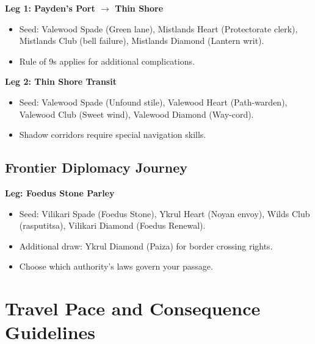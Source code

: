 \textbf{Leg 1: Payden's Port $\rightarrow$ Thin Shore}
\begin{itemize}
    \item Seed: Valewood Spade (Green lane), Mistlands Heart (Protectorate clerk), Mistlands Club (bell failure), Mistlands Diamond (Lantern writ).
    \item Rule of 9s applies for additional complications.
\end{itemize}

\textbf{Leg 2: Thin Shore Transit}
\begin{itemize}
    \item Seed: Valewood Spade (Unfound stile), Valewood Heart (Path‑warden), Valewood Club (Sweet wind), Valewood Diamond (Way‑cord).
    \item Shadow corridors require special navigation skills.
\end{itemize}

\subsection{Frontier Diplomacy Journey}\label{subsec:frontier_diplomacy}

\textbf{Leg: Foedus Stone Parley}
\begin{itemize}
    \item Seed: Vilikari Spade (Foedus Stone), Ykrul Heart (Noyan envoy), Wilds Club (rasputitsa), Vilikari Diamond (Foedus Renewal).
    \item Additional draw: Ykrul Diamond (Paiza) for border crossing rights.
    \item Choose which authority's laws govern your passage.
\end{itemize}

\section{Travel Pace and Consequence Guidelines}\label{sec:pace_consequences}

